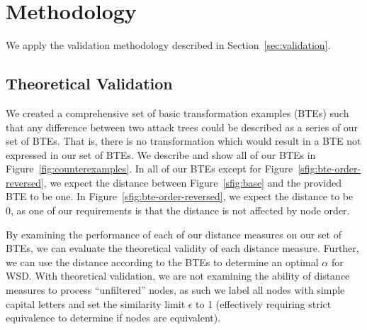 \section{Methodology}
\label{sec:methodology}

We apply the validation methodology described in Section~\ref{sec:validation}.


\subsection{Theoretical Validation}
\label{ssec:methodology-examples}


We created a comprehensive set of basic transformation examples (BTEs) such that any difference between two attack trees could be described as a series of our set of BTEs. That is, there is no transformation which would result in a BTE not expressed in our set of BTEs. We describe and show all of our BTEs in Figure~\ref{fig:counterexamples}. In all of our BTEs except for Figure~\ref{sfig:bte-order-reversed}, we expect the distance between Figure~\ref{sfig:base} and the provided BTE to be one. In Figure~\ref{sfig:bte-order-reversed}, we expect the distance to be 0, as one of our requirements is that the distance is not affected by node order.

By examining the performance of each of our distance measures on our set of BTEs, we can evaluate the theoretical validity of each distance measure. Further, we can use the distance according to the BTEs to determine an optimal $\alpha$ for WSD. With theoretical validation, we are not examining the ability of distance measures to process ``unfiltered'' nodes, as such we label all nodes with simple capital letters and set the similarity limit $\epsilon$ to 1 (effectively requiring strict equivalence to determine if nodes are equivalent).




